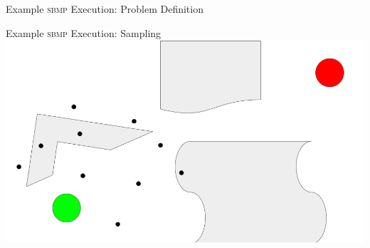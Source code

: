 \documentclass{beamer}
\begin{document}
\begin{frame}{Example \textsc{sbmp} Execution: Problem Definition}
\end{frame}

\begin{frame}{Example \textsc{sbmp} Execution: Sampling}
\includegraphics[width=\textwidth]{./assets/rrt_slides/rrt_slides_3.png}
\end{frame}
\end{document}
